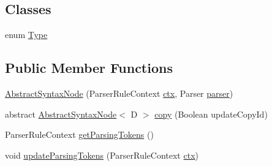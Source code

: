 \subsection*{Classes}
\begin{DoxyCompactItemize}
\item 
enum \hyperlink{enumit_1_1emarolab_1_1cagg_1_1core_1_1language_1_1syntax_1_1abstractTree_1_1AbstractSyntaxNode_3f088e462016145511ce70dc364c19523}{Type}
\end{DoxyCompactItemize}
\subsection*{Public Member Functions}
\begin{DoxyCompactItemize}
\item 
\hyperlink{classit_1_1emarolab_1_1cagg_1_1core_1_1language_1_1syntax_1_1abstractTree_1_1AbstractSyntaxNode_366ce7377666ed8848a32408270165e9_a095675c3aa9c3665ab1f21433cc082ba}{Abstract\-Syntax\-Node} (Parser\-Rule\-Context \hyperlink{classit_1_1emarolab_1_1cagg_1_1core_1_1language_1_1syntax_1_1abstractTree_1_1AbstractSyntaxNode_366ce7377666ed8848a32408270165e9_a5f2fc206d7f95eb3df51386a3379fa41}{ctx}, Parser \hyperlink{classit_1_1emarolab_1_1cagg_1_1core_1_1language_1_1syntax_1_1abstractTree_1_1AbstractSyntaxNode_366ce7377666ed8848a32408270165e9_a62dbf3357a74a39f5b4094ecef90a168}{parser})
\item 
abstract \hyperlink{classit_1_1emarolab_1_1cagg_1_1core_1_1language_1_1syntax_1_1abstractTree_1_1AbstractSyntaxNode_366ce7377666ed8848a32408270165e9_a095675c3aa9c3665ab1f21433cc082ba}{Abstract\-Syntax\-Node}$<$ D $>$ \hyperlink{classit_1_1emarolab_1_1cagg_1_1core_1_1language_1_1syntax_1_1abstractTree_1_1AbstractSyntaxNode_366ce7377666ed8848a32408270165e9_a253bda49c0ae5d96603e540f85cff6d6}{copy} (Boolean update\-Copy\-Id)
\item 
Parser\-Rule\-Context \hyperlink{classit_1_1emarolab_1_1cagg_1_1core_1_1language_1_1syntax_1_1abstractTree_1_1AbstractSyntaxNode_366ce7377666ed8848a32408270165e9_ade97170416ed6cb74b405169f1ed937a}{get\-Parsing\-Tokens} ()
\item 
void \hyperlink{classit_1_1emarolab_1_1cagg_1_1core_1_1language_1_1syntax_1_1abstractTree_1_1AbstractSyntaxNode_366ce7377666ed8848a32408270165e9_a06852dbb0973241b60af9fc5a755b76f}{update\-Parsing\-Tokens} (Parser\-Rule\-Context \hyperlink{classit_1_1emarolab_1_1cagg_1_1core_1_1language_1_1syntax_1_1abstractTree_1_1AbstractSyntaxNode_366ce7377666ed8848a32408270165e9_a5f2fc206d7f95eb3df51386a3379fa41}{ctx})

\end{DoxyCompactItemize}

